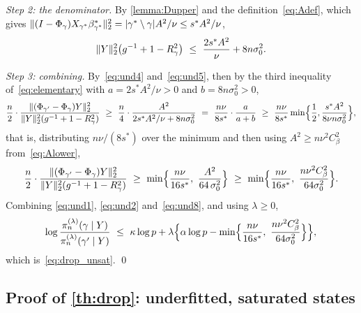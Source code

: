 \emph{Step 2: the denominator.} By \cref{lemma:Dupper} and the
definition~\eqref{eq:Adef}, which gives
$\lVert(I-\Phi_\gamma)X_{\gamma^{\ast}}\beta^{\ast}_{\gamma^{\ast}}\rVert_2^{2}
=\lvert\gamma^{\ast}\setminus\gamma\rvert A^{2}/\nu\leq s^{\ast}A^{2}/\nu$,
\begin{equation}
    \label{eq:und5}
    \lVert Y\rVert_2^{2}\bigl(g^{-1}+1-R^{2}_{\gamma}\bigr)
    \ \leq\ \frac{2s^{\ast}A^{2}}{\nu}+8n\sigma_0^{2} .
\end{equation}

\emph{Step 3: combining.} By~\eqref{eq:und4} and~\eqref{eq:und5}, then by
the third inequality of~\eqref{eq:elementary} with
$a=2s^{\ast}A^{2}/\nu>0$ and $b=8n\sigma_0^{2}>0$,
\begin{equation}
    \label{eq:und6}
    \frac n2\cdot
    \frac{\lVert(\Phi_{\gamma'}-\Phi_\gamma)Y\rVert_2^{2}}
    {\lVert Y\rVert_2^{2}(g^{-1}+1-R^{2}_{\gamma})}
    \ \geq\ \frac n4\cdot\frac{A^{2}}
    {2s^{\ast}A^{2}/\nu+8n\sigma_0^{2}}
    \ =\ \frac{n\nu}{8s^{\ast}}\cdot\frac{a}{a+b}
    \ \geq\ \frac{n\nu}{8s^{\ast}}
    \min\Bigl\{\frac12,\frac{s^{\ast}A^{2}}
    {8\nu n\sigma_0^{2}}\Bigr\} ,
\end{equation}
that is, distributing $n\nu/(8s^{\ast})$ over the minimum and then
using $A^{2}\geq n\nu^{2}C_\beta^{2}$ from~\eqref{eq:Alower},
\begin{equation}
    \label{eq:und8}
    \frac n2\cdot
    \frac{\lVert(\Phi_{\gamma'}-\Phi_\gamma)Y\rVert_2^{2}}
    {\lVert Y\rVert_2^{2}(g^{-1}+1-R^{2}_{\gamma})}
    \ \geq\ \min\Bigl\{\frac{n\nu}{16s^{\ast}},\
    \frac{A^{2}}{64\,\sigma_0^{2}}\Bigr\}
    \ \geq\ \min\Bigl\{\frac{n\nu}{16s^{\ast}},\ \frac{n\nu^{2}C_\beta^{2}}{64\sigma_0^{2}}\Bigr\} .
\end{equation}
Combining \eqref{eq:und1}, \eqref{eq:und2} and~\eqref{eq:und8}, and using
$\lambda\geq0$,
\begin{equation*}
    \log\frac{\pi_n^{(\lambda)}(\gamma\mid Y)}
    {\pi_n^{(\lambda)}(\gamma'\mid Y)}
    \ \leq\ \kappa\log p
    +\lambda\Bigl\{\alpha\log p-\min\Bigl\{\frac{n\nu}{16s^{\ast}},\ \frac{n\nu^{2}C_\beta^{2}}{64\sigma_0^{2}}\Bigr\}\Bigr\} ,
\end{equation*}
which is~\eqref{eq:drop_unsat}. \qed

\subsection{Proof of \cref{th:drop}: underfitted, saturated states}
\label{sub:sat}

